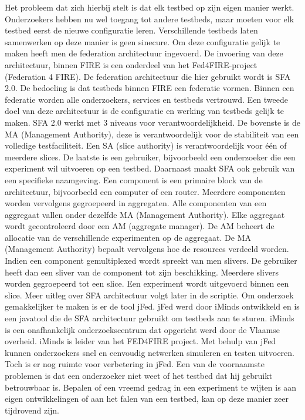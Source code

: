 \npar
Het probleem dat zich hierbij stelt is dat elk testbed op zijn eigen manier werkt. Onderzoekers hebben nu wel toegang tot andere testbeds, maar moeten voor elk testbed eerst de nieuwe configuratie leren. Verschillende testbeds laten samenwerken op deze manier is geen sinecure. Om deze configuratie gelijk te maken heeft men de federation architectuur ingevoerd. De invoering van deze architectuur, binnen FIRE is een onderdeel van het Fed4FIRE-project (Federation 4 FIRE). De federation architectuur die hier gebruikt wordt is SFA 2.0. De bedoeling is dat testbeds binnen FIRE een federatie vormen. Binnen een federatie worden alle onderzoekers, services en testbeds vertrouwd. Een tweede doel van deze architectuur is de configuratie en werking van testbeds gelijk te maken.
\npar
SFA 2.0 werkt met 3 niveaus voor verantwoordelijkheid. De bovenste is de MA (Management Authority), deze is verantwoordelijk voor de stabiliteit van een volledige testfaciliteit. Een SA (slice authority) is verantwoordelijk voor \'e\'en of meerdere slices. De laatste is een gebruiker, bijvoorbeeld een onderzoeker die een experiment wil uitvoeren op een testbed.
\npar
Daarnaast maakt SFA ook gebruik van een specifieke naamgeving. Een component is een primaire block van de architectuur, bijvoorbeeld een computer of een router. Meerdere componenten worden vervolgens gegroepeerd in aggregaten. Alle componenten van een aggregaat vallen onder dezelfde MA (Management Authority). Elke aggregaat wordt gecontroleerd door een AM (aggregate manager). De AM beheert de allocatie van de verschillende experimenten op de aggregaat.
\npar
De MA (Management Authority) bepaalt vervolgens hoe de resources verdeeld worden. Indien een component gemultiplexed wordt spreekt van men slivers. De gebruiker heeft dan een sliver van de component tot zijn beschikking. Meerdere slivers worden gegroepeerd tot een slice. Een experiment wordt uitgevoerd binnen een slice. Meer uitleg over SFA architectuur volgt later in de scriptie.
\npar
Om onderzoek gemakkelijker te maken is er de tool jFed.
jFed werd door iMinds ontwikkeld\citep{iminds-jFed} en is een javatool die de SFA architectuur gebruikt om testbeds aan te sturen.
iMinds is een onafhankelijk onderzoekscentrum dat opgericht werd door de Vlaamse overheid\citep{iMinds-what-is}. iMinds is leider van het FED4FIRE project\citep{iminds-FED4FIRE}.
\npar
Met behulp van jFed kunnen onderzoekers snel en eenvoudig netwerken simuleren en testen uitvoeren. Toch is er nog ruimte voor verbetering in jFed. Een van de voornaamste problemen is dat een onderzoeker niet weet of het testbed dat hij gebruikt betrouwbaar is. Bepalen of een vreemd gedrag in een experiment te wijten is aan eigen ontwikkelingen of aan het falen van een testbed, kan op deze manier zeer tijdrovend zijn.
